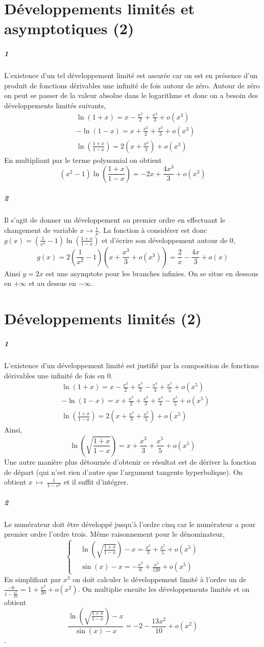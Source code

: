 \documentclass[10pt,a4paper]{article}
\newcommand{\al}[1]{\begin{aligned} #1 \end{aligned}}
\begin{document}
\section{Développements limités et asymptotiques (2)}
\subparagraph{1}L'existence d'un tel développement limité est assurée car on est en présence d'un produit de fonctions dérivables une infinité de fois autour de zéro. Autour de zéro on peut se passer de la valeur absolue dans le logarithme et donc on a besoin des développements limités suivants,
\[
\al{
&\ln(1+x) = x - \frac{x^2}{2} + \frac{x^3}{3} + o(x^3) \\
&-\ln(1-x) = x +\frac{x^2}{2} + \frac{x^3}{3} + o(x^3) \\
&\ln\left( \frac{1+x}{1-x} \right) = 2(x+ \frac{x^3}{3}) + o(x^3)
}
\]
En multipliant par le terme polynomial on obtient
\[
(x^2-1)\ln\left( \frac{1+x}{1-x} \right) = -2x + \frac{4x^3}{3} + o(x^3)
\]
\subparagraph{2}Il s'agit de donner un développement au premier ordre en effectuant le changement de variable $x \rightarrow \frac{1}{x}$. La fonction à considérer est donc $g(x) = (\frac{1}{x^2}-1) \ln \left( \frac{1+x}{1-x} \right)$ et d'écrire son développement autour de $0$,
\[
g(x) = 2(\frac{1}{x^2}-1)(x+ \frac{x^3}{3} + o(x^3)) = \frac{2}{x} -\frac{4x}{3} + o(x) 
\]
Ainsi $y=2x$ est une asymptote pour les branches infinies. On se situe en dessous en $+ \infty$ et au dessus en $-\infty$.

\section{Développements limités (2)}
\subparagraph{1}L'existence d'un développement limité est justifié par la composition de fonctions dérivables une infinité de fois en $0$.
\[
\al{
&\ln(1+x) = x - \frac{x^2}{2} + \frac{x^3}{3} -\frac{x^4}{4} + \frac{x^5}{5} + o(x^5) \\
&-\ln(1-x) = x +\frac{x^2}{2} + \frac{x^3}{3} +\frac{x^4}{4} - \frac{x^5}{5} + o(x^5) \\
&\ln\left( \frac{1+x}{1-x} \right) = 2(x+ \frac{x^3}{3} + \frac{x^5}{5}) + o(x^5)
}
\]
Ainsi,
\[
\ln \left( \sqrt{\frac{1+x}{1-x}} \right) = x + \frac{x^3}{3} + \frac{x^5}{5} + o(x^5)
\]
Une autre manière plus détournée d'obtenir ce résultat est de dériver la fonction de départ (qui n'est rien d'autre que l'argument tangente hyperbolique). On obtient $x \ \mapsto \ \frac{1}{1-x^2}$ et il suffit d'intégrer.
\subparagraph{2} Le numérateur doit être développé jusqu'à l'ordre cinq car le numérateur a pour premier ordre l'ordre trois. Même raisonnement pour le dénominateur,
\[
\left\lbrace
\al{
& \ln \left( \sqrt{\frac{1+x}{1-x}} \right) -x = \frac{x^3}{3} + \frac{x^5}{5} + o(x^5) \\
&\sin(x) - x = -\frac{x^3}{6} + \frac{x^5}{120} + o(x^5)
}\right.
\]
En simplifiant par $x^3$ on doit calculer le développement limité à l'ordre un de ${\frac{-6}{1 - \frac{x^2}{20}} = 1 + \frac{x^2}{20} + o(x^2) }$. On multiplie ensuite les développements limités et on obtient
\[
\frac{\ln \left( \sqrt{\frac{1+x}{1-x}} \right) -x}{\sin(x) - x} = -2 - \frac{13x^2}{10} + o(x^2)
\].
\end{document}
